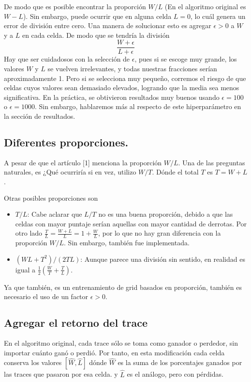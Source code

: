 \documentclass[11pt]{article}
\begin{document}
De modo que es posible encontrar la proporción $W/L$ (En el algoritmo original es $W-L$). Sin embargo, puede ocurrir que en alguna celda $L=0$, lo cuál genera un error de división entre cero. Una manera de solucionar esto es agregar $\epsilon >0$ a $W$ y a $L$ en cada celda. De modo que se tendría la división
\begin{equation}
    \frac{W + \epsilon}{L + \epsilon}
\end{equation}
Hay que ser cuidadosos con la selección de $\epsilon$, pues si se escoge muy grande, los valores $W$ y $L$ se vuelven irrelevantes, y todas nuestras fracciones serían aproximadamente 1. Pero si  se selecciona muy pequeño, corremos el riesgo de que celdas cuyos valores sean demasiado elevados, logrando que la media sea menos significativa. En la práctica, se obtivieron resultados muy buenos usando $\epsilon=100$ o $\epsilon=1000$. Sin embargo, hablaremos más al respecto de este hiperparámetro en la sección de resultados.

\subsection{Diferentes proporciones.}
A pesar de que el artículo [1] menciona la proporción $W/L$. Una de las preguntas naturales, es ¿Qué ocurriría si en vez, utilizo $W/T$. Dónde el total $T$ es $T = W+L$. 

Otras posibles proporciones son
\begin{itemize}
    \item $T/L$: Cabe aclarar que $L/T$ no es una buena proporción, debido a que las celdas con mayor puntaje serían aquellas con mayor cantidad de derrotas. Por otro lado $\frac{T}{L} = \frac{W+L}{L} = 1 + \frac{W}{L}$, por lo que no hay gran diferencia con la proporción $W/L$. Sin embargo, también fue implementada.
    \item $(WL + T^2)/(2TL)$: Aunque parece una división sin sentido, en realidad es igual a $\frac{1}{2}\left(\frac{W}{T} + \frac{T}{L}\right)$.
\end{itemize}
Ya que también, es un entrenamiento de grid basados en proporción, también es necesario el uso de un factor $\epsilon > 0$.

\subsection{Agregar el retorno del trace}
En el algoritmo original, cada trace sólo se toma como ganador o perdedor, sin importar cuánto ganó o perdió. Por tanto, en esta modificación cada celda conserva los valores $[\hat W, \hat L]$ dónde $\hat W$ es la suma de los porcentajes ganados por las traces que pasaron por esa celda. y $\hat L$ es el análogo, pero con pérdidas.
\end{document}
